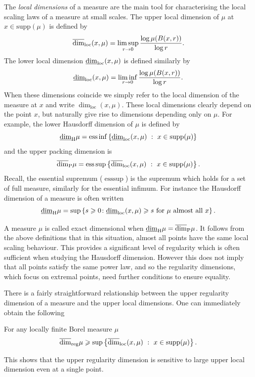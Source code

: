 The \textit{local dimensions} of a measure are the main tool for characterising the local scaling laws of a measure at small scales. The upper local dimension of $\mu$ at $x \in \text{supp}(\mu)$ is defined by
\[
\ulocal=\limsup_{r\rightarrow 0} \frac{\log \mu(B(x,r))}{\log r}.
\]
The lower local dimension $\llocal$ is defined similarly by
\[
\llocal=\liminf_{r\rightarrow 0} \frac{\log \mu(B(x,r))}{\log r}.
\]
When these dimensions coincide we simply refer to the local dimension of the measure at $x$ and write $\dim_{\text{loc}}(x,\mu)$. These local dimensions clearly depend on the point $x$, but naturally give rise to dimensions depending only on $\mu$. For example, the lower Hausdorff dimension of $\mu$ is defined by
\[
\underline{\dim}_\H \mu=\text{ess}  \inf \left\{  \underline{\dim}_{\text{loc}}(x,\mu)  \ : \  x\in \text{supp}(\mu) \right\} 
\]
and the upper packing dimension is
\[
\overline{\dim}_\P \mu=\text{ess}  \sup \left\{ \overline{\dim}_{\text{loc}}(x,\mu) \ : \  x\in \text{supp}(\mu) \right\}.
\]
Recall, the essential supremum ($\text{ess} \sup$) is the supremum which holds for a set of full measure, similarly for the essential infimum. For instance the Hausdorff dimension of a measure is often written $$\underline{\dim}_\H \mu = \sup\left\{ s \ge 0 \colon \llocal \ge s  \text{ for $\mu$ almost all }x  \right\}.$$ 

A measure $\mu$ is called exact dimensional when $\underline{\dim}_\H \mu=\overline{\dim}_\P \mu$. It follows from the above definitions that in this situation, almost all points have the same local scaling behaviour. This provides a significant level of regularity which is often sufficient when studying the Hausdorff dimension. However this does not imply that all points satisfy the same power law, and so the regularity dimensions, which focus on extremal points, need further conditions to ensure equality.


There is a fairly straightforward relationship between the upper regularity dimension of a measure and the upper local dimensions. One can immediately obtain the following

\begin{lemma}
For any locally finite Borel measure $\mu$
\[
\r \geq \sup \left\{ \overline{\dim}_{\text{loc}}(x,\mu) \ : \  x\in \text{supp}(\mu) \right\}.
\]
\end{lemma} 
This shows that the upper regularity dimension is sensitive to large upper local dimension even at a single point.  


